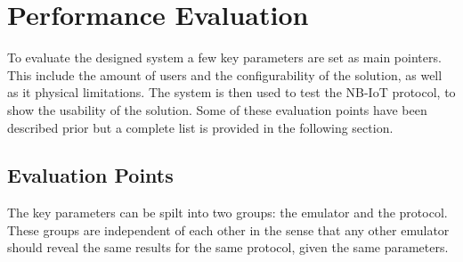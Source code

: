 \chapter{Performance Evaluation}

To evaluate the designed system a few key parameters are set as main pointers. This include the amount of users and the configurability of the solution, as well as it physical limitations. The system is then used to test the NB-IoT protocol, to show the usability of the solution. Some of these evaluation points have been described prior but a complete list is provided in the following section.

\section{Evaluation Points}
The key parameters can be spilt into two groups: the emulator and the protocol. These groups are independent of each other in the sense that any other emulator should reveal the same results for the same protocol, given the same parameters.

